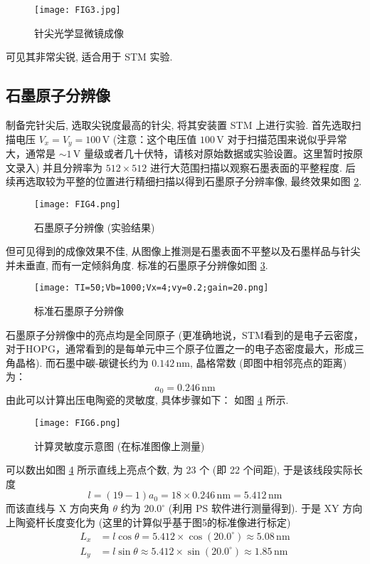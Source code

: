 \documentclass{whureport}
\begin{document}
\begin{multicols}{2}
\begin{figure}[H]
 \centering
 \texttt{[image: FIG3.jpg]} %
 \caption{针尖光学显微镜成像}
 \label{fig:tip_image}
\end{figure}
可见其非常尖锐, 适合用于 STM 实验.

\subsection{石墨原子分辨像}
制备完针尖后, 选取尖锐度最高的针尖, 将其安装置 STM 上进行实验.
首先选取扫描电压 \( V_x = V_y = 100 \, \text{V} \) (注意：这个电压值 \(100\,\text{V}\) 对于扫描范围来说似乎异常大，通常是 \( \sim 1\,\text{V} \) 量级或者几十伏特，请核对原始数据或实验设置。这里暂时按原文录入) 并且分辨率为 \( 512 \times 512 \) 进行大范围扫描以观察石墨表面的平整程度. 后续再选取较为平整的位置进行精细扫描以得到石墨原子分辨率像, 最终效果如图 \ref{fig:hopg_exp}.

\begin{figure}[H]
 \centering
 \texttt{[image: FIG4.png]} %
 \caption{石墨原子分辨像 (实验结果)}
 \label{fig:hopg_exp}
\end{figure}
但可见得到的成像效果不佳, 从图像上推测是石墨表面不平整以及石墨样品与针尖并未垂直, 而有一定倾斜角度.
标准的石墨原子分辨像如图 \ref{fig:hopg_std}.

\begin{figure}[H]
 \centering
 \texttt{[image: TI=50;Vb=1000;Vx=4;vy=0.2;gain=20.png]} %
 \caption{标准石墨原子分辨像}
 \label{fig:hopg_std}
\end{figure}
石墨原子分辨像中的亮点均是全同原子 (更准确地说，STM看到的是电子云密度，对于HOPG，通常看到的是每单元中三个原子位置之一的电子态密度最大，形成三角晶格). 而石墨中碳-碳键长约为 \( 0.142 \, \text{nm} \), 晶格常数 (即图中相邻亮点的距离) 为：
\[ a_0 = 0.246 \, \text{nm} \] %
由此可以计算出压电陶瓷的灵敏度, 具体步骤如下：
如图 \ref{fig:calibration} 所示.

\begin{figure}[H]
 \centering
 \texttt{[image: FIG6.png]} %
 \caption{计算灵敏度示意图 (在标准图像上测量)}
 \label{fig:calibration}
\end{figure}

可以数出如图 \ref{fig:calibration} 所示直线上亮点个数, 为 23 个 (即 22 个间距), 于是该线段实际长度
\[ l = (19 - 1)a_0 = 18 \times 0.246 \, \text{nm} = 5.412 \, \text{nm} \] %
而该直线与 X 方向夹角 \( \theta \) 约为 \( 20.0^\circ \) (利用 PS 软件进行测量得到).
于是 XY 方向上陶瓷杆长度变化为 (这里的计算似乎基于图5的标准像进行标定)
\begin{align}
 L_x &= l \cos \theta = 5.412 \times \cos(20.0^\circ) \approx 5.08 \, \text{nm} \label{eq:Lx} \\ %
 L_y &= l \sin \theta \approx 5.412 \times \sin(20.0^\circ) \approx 1.85 \, \text{nm} \label{eq:Ly} %
\end{align}


\end{multicols}
\end{document}
